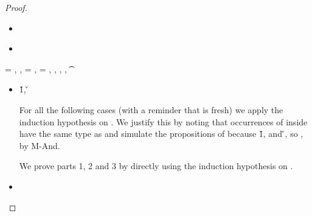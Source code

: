 \begin{lemma}
\begin{enumerate}
\begin{proof}
\begin{case}[T-If]
  \begin{itemize}
    \item[]
      \begin{subcase}[B-If]
      \end{subcase}
    \item[]
      \begin{subcase}[BE-If]
      \end{subcase}
  \end{itemize}
\end{case}

\begin{case}[T-Let]
  \e{} = { {} {}},
  \judgement {\propenv{}} { {\s{}}} { {}}
             {},
             \propp{} = {\impprop {\notprop {\falsy{}} {\x{}}} {}},
             \proppp{} = {\impprop {\isprop {\falsy{}} {\x{}}} {}},
  \judgement
       {\propenv{}, {\isprop {\s{}} {\x{}}},
         {\propp{}},
         {\proppp{}}}
             { {\t{}}} {\filterset {\thenprop {\prop{}}} {\elseprop {\prop{}}}}
             {\object{}} 


  \begin{itemize}
    \item[]
      \begin{subcase}[B-Let]
        \opsem {\openv{}} {} {\v{1}},
         {} {\v{}}

        For all the following cases (with a reminder that \x{} is fresh)
        we apply the induction hypothesis on . We justify this by noting
        that occurrences of \x{} inside  have the same type as  and 
        simulate the propositions of 
        because 
        \opsem {\openv{}} {} {\v{1}},
        and
         {} {\v{}},
        so \satisfies{\openv{}}{\propenv{}, {\isprop {\s{}} {\x{}}}, \propp{}, \proppp{}},
        by M-And.

        We prove parts 1, 2 and 3 by directly using the induction hypothesis on .
      \end{subcase}
    \item[]
      \begin{subcase}[BE-Let]
      \end{subcase}
  \end{itemize}
\end{case}


\end{proof}
\end{enumerate}
\end{lemma}
